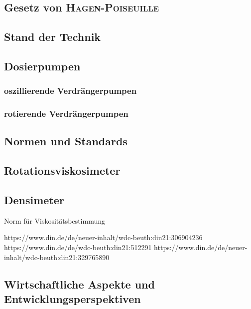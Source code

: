 \subsection{Gesetz von  \textsc{Hagen}-\textsc{Poiseuille}}


\subsection{Stand der Technik}
\subsection{Dosierpumpen}
\subsubsection{oszillierende Verdrängerpumpen}
\subsubsection{rotierende Verdrängerpumpen}

\subsection{Normen und Standards}

\subsection{Rotationsviskosimeter}
\subsection{Densimeter}

Norm für Viskositätsbestimmung

https://www.din.de/de/neuer-inhalt/wdc-beuth:din21:306904236
https://www.din.de/de/wdc-beuth:din21:512291
https://www.din.de/de/neuer-inhalt/wdc-beuth:din21:329765890

\subsection{Wirtschaftliche Aspekte und Entwicklungsperspektiven}